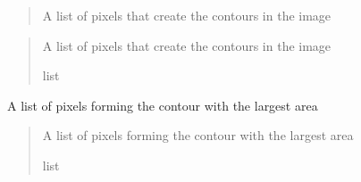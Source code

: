 \documentclass[letterpaper,10pt,english]{sphinxmanual}
\begin{document}

\begin{fulllineitems}
\label{\detokenize{forensicfit.utils.image_tools:forensicfit.utils.image_tools.contours}}
\pysigstartsignatures
{}
\pysigstopsignatures\begin{quote}

\sphinxAtStartPar
A list of pixels that create the contours in the image
\end{quote}
\begin{quote}\begin{description}
\sphinxAtStartPar
{} \textendash{} A list of pixels that create the contours in the image

\sphinxAtStartPar
list

\end{description}\end{quote}

\end{fulllineitems}


\begin{fulllineitems}
\label{\detokenize{forensicfit.utils.image_tools:forensicfit.utils.image_tools.largest_contour}}
\pysigstartsignatures
{}
\pysigstopsignatures
\sphinxAtStartPar
A list of pixels forming the contour with the largest area
\begin{quote}\begin{description}
\sphinxAtStartPar
{} \textendash{} A list of pixels forming the contour with the largest area

\sphinxAtStartPar
list

\end{description}\end{quote}

\end{fulllineitems}
\end{document}
